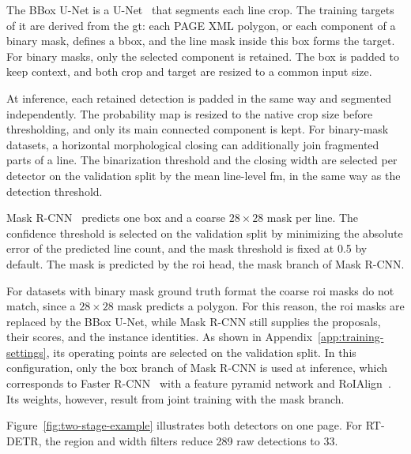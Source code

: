 The BBox U-Net is a U-Net~\cite{DBLP:journals/corr/RonnebergerFB15} that segments each line crop. The training targets of it are derived from the \gls{gt}: each PAGE XML polygon, or each component of a binary mask, defines a \gls{bbox}, and the line mask inside this box forms the target. For binary masks, only the selected component is retained. The box is padded to keep context, and both crop and target are resized to a common input size.

At inference, each retained detection is padded in the same way and segmented independently. The probability map is resized to the native crop size before thresholding, and only its main connected component is kept. For binary-mask datasets, a horizontal morphological closing can additionally join fragmented parts of a line. The binarization threshold and the closing width are selected per detector on the validation split by the mean line-level \gls{fm}, in the same way as the detection threshold.

Mask R-CNN\label{sec:mask-rcnn-method}~\cite{he2017maskrcnn} predicts one box and a coarse \(28\times28\) mask per line. The confidence threshold is selected on the validation split by minimizing the absolute error of the predicted line count, and the mask threshold is fixed at 0.5 by default. The mask is predicted by the \gls{roi} head, the mask branch of Mask R-CNN.

For datasets with binary mask ground truth format the coarse \gls{roi} masks do not match, since a \(28\times28\) mask predicts a polygon. For this reason, the \gls{roi} masks are replaced by the BBox U-Net, while Mask R-CNN still supplies the proposals, their scores, and the instance identities. As shown in Appendix~\ref{app:training-settings}, its operating points are selected on the validation split. In this configuration, only the box branch of Mask R-CNN is used at inference, which corresponds to Faster R-CNN~\cite{ren2017fasterrcnn} with a feature pyramid network and RoIAlign~\cite{he2017maskrcnn}. Its weights, however, result from joint training with the mask branch.

Figure~\ref{fig:two-stage-example} illustrates both detectors on one page. For RT-DETR, the region and width filters reduce 289 raw detections to 33.

